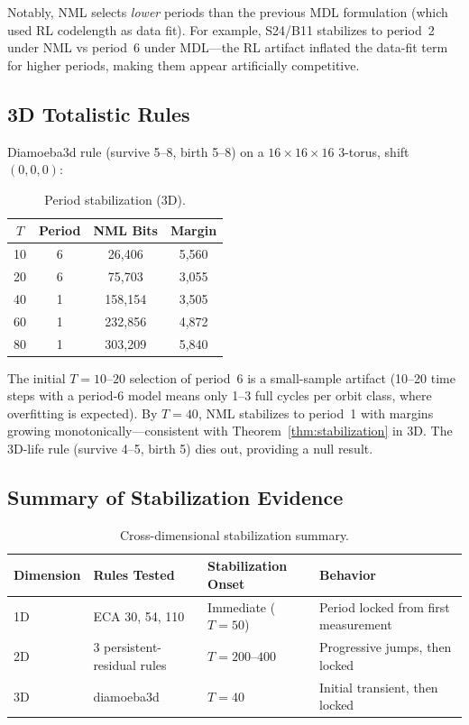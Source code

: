 \documentclass[11pt]{article}
\theoremstyle{definition}
\theoremstyle{remark}
\begin{document}
Notably, NML selects \emph{lower} periods than the previous MDL formulation (which used RL codelength as data fit).
For example, S24/B11 stabilizes to period~2 under NML vs period~6 under MDL---the RL artifact inflated the data-fit term for higher periods, making them appear artificially competitive.

\subsection{3D Totalistic Rules}

Diamoeba3d rule (survive 5--8, birth 5--8) on a $16 \times 16 \times 16$ 3-torus, shift $(0,0,0)$:

\begin{table}[h]
\centering
\caption{Period stabilization (3D).}
\begin{tabular}{cccc}
\toprule
$T$ & Period & NML Bits & Margin \\
\midrule
10 & 6 & 26{,}406  & 5{,}560 \\
20 & 6 & 75{,}703  & 3{,}055 \\
40 & 1 & 158{,}154 & 3{,}505 \\
60 & 1 & 232{,}856 & 4{,}872 \\
80 & 1 & 303{,}209 & 5{,}840 \\
\bottomrule
\end{tabular}
\end{table}

The initial $T{=}10$--$20$ selection of period~6 is a small-sample artifact (10--20 time steps with a period-6 model means only 1--3 full cycles per orbit class, where overfitting is expected).
By $T{=}40$, NML stabilizes to period~1 with margins growing monotonically---consistent with Theorem~\ref{thm:stabilization} in 3D.
The 3D-life rule (survive 4--5, birth 5) dies out, providing a null result.

\subsection{Summary of Stabilization Evidence}

\begin{table}[h]
\centering
\caption{Cross-dimensional stabilization summary.}
\begin{tabular}{llll}
\toprule
Dimension & Rules Tested & Stabilization Onset & Behavior \\
\midrule
1D & ECA 30, 54, 110            & Immediate ($T{=}50$) & Period locked from first measurement \\
2D & 3 persistent-residual rules & $T{=}200$--$400$     & Progressive jumps, then locked \\
3D & diamoeba3d                  & $T{=}40$             & Initial transient, then locked \\
\bottomrule
\end{tabular}
\end{table}
\end{document}
